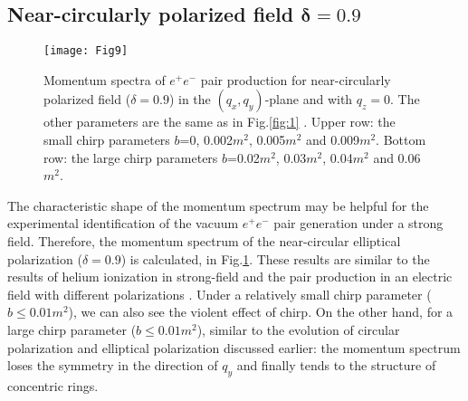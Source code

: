 \documentclass[aps,preprint,superscriptaddress]{revtex4}
\begin{document}
\begin{appendix}
\subsection{Near-circularly polarized field $\mathbf{\delta}$$\mathbf{=}$$\mathbf{0.9}$}

\begin{figure}[ht]%
\begin{center}
\texttt{[image: Fig9]}
\end{center}
\vspace{-8mm}
\caption{Momentum spectra of $e^{+}e^{-}$ pair production for near-circularly polarized field ($\delta=0.9$) in the $( q _x,q_y)$-plane and with $q_z=0$. The other parameters are the same as in Fig.\ref{fig:1} .
Upper row: the small chirp parameters $b$=0, 0.002$m^2$, 0.005$m^2$ and 0.009$m^2$. Bottom row: the large chirp parameters $b$=0.02$m^2$, 0.03$m^2$, 0.04$m^2$ and 0.06$m^2$.}
\label{fig:8}
\end{figure}

The characteristic shape of the momentum spectrum may be helpful for the experimental identification of the vacuum $e^{+}e^{-}$ pair generation under a strong field. Therefore, the momentum spectrum of the near-circular elliptical polarization ($\delta=0.9$) is calculated, in Fig.\ref{fig:8}. These results are similar to the results of helium ionization in strong-field \cite{Pfeiffer:2012pl} and the pair production in an electric field with different polarizations \cite{Li2}. Under a relatively small chirp parameter ($b\le0.01$$m^2$), we can also see the violent effect of chirp. On the other hand, for a large chirp parameter ($b\le0.01$$m^2$), similar to the evolution of circular polarization and elliptical polarization discussed earlier: the momentum spectrum loses the symmetry in the direction of $q_y$ and finally tends to the structure of concentric rings.

\bigskip

  \end{appendix}

\bigskip
\end{document}
